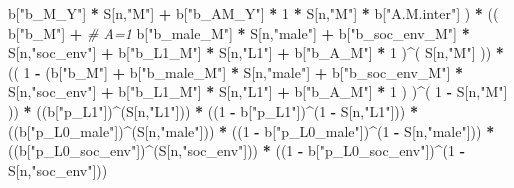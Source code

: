 \documentclass[
]{book}
\newenvironment{Shaded}{\begin{snugshade}}{\end{snugshade}}
\newcommand{\CommentTok}[1]{\textcolor[rgb]{0.56,0.35,0.01}{\textit{#1}}}
\newcommand{\DecValTok}[1]{\textcolor[rgb]{0.00,0.00,0.81}{#1}}
\newcommand{\NormalTok}[1]{#1}
\newcommand{\SpecialCharTok}[1]{\textcolor[rgb]{0.81,0.36,0.00}{\textbf{#1}}}
\newcommand{\StringTok}[1]{\textcolor[rgb]{0.31,0.60,0.02}{#1}}
\begin{document}
\begin{Shaded}
\begin{Highlighting}[]
\NormalTok{                             b[}\StringTok{"b\_M\_Y"}\NormalTok{] }\SpecialCharTok{*}\NormalTok{ S[n,}\StringTok{"M"}\NormalTok{] }\SpecialCharTok{+}
\NormalTok{                             b[}\StringTok{"b\_AM\_Y"}\NormalTok{] }\SpecialCharTok{*} \DecValTok{1} \SpecialCharTok{*}\NormalTok{ S[n,}\StringTok{"M"}\NormalTok{] }\SpecialCharTok{*}\NormalTok{ b[}\StringTok{"A.M.inter"}\NormalTok{] ) }\SpecialCharTok{*}
\NormalTok{      (( b[}\StringTok{"b\_M"}\NormalTok{] }\SpecialCharTok{+}                                                             \CommentTok{\# A\textquotesingle{}=1}
\NormalTok{           b[}\StringTok{"b\_male\_M"}\NormalTok{] }\SpecialCharTok{*}\NormalTok{ S[n,}\StringTok{"male"}\NormalTok{] }\SpecialCharTok{+} 
\NormalTok{           b[}\StringTok{"b\_soc\_env\_M"}\NormalTok{] }\SpecialCharTok{*}\NormalTok{ S[n,}\StringTok{"soc\_env"}\NormalTok{] }\SpecialCharTok{+} 
\NormalTok{           b[}\StringTok{"b\_L1\_M"}\NormalTok{] }\SpecialCharTok{*}\NormalTok{ S[n,}\StringTok{"L1"}\NormalTok{] }\SpecialCharTok{+}
\NormalTok{           b[}\StringTok{"b\_A\_M"}\NormalTok{] }\SpecialCharTok{*} \DecValTok{1}\NormalTok{ )}\SpecialCharTok{\^{}}\NormalTok{( S[n,}\StringTok{"M"}\NormalTok{] )) }\SpecialCharTok{*}
\NormalTok{      (( }\DecValTok{1} \SpecialCharTok{{-}}\NormalTok{ (b[}\StringTok{"b\_M"}\NormalTok{] }\SpecialCharTok{+} 
\NormalTok{                b[}\StringTok{"b\_male\_M"}\NormalTok{] }\SpecialCharTok{*}\NormalTok{ S[n,}\StringTok{"male"}\NormalTok{] }\SpecialCharTok{+} 
\NormalTok{                b[}\StringTok{"b\_soc\_env\_M"}\NormalTok{] }\SpecialCharTok{*}\NormalTok{ S[n,}\StringTok{"soc\_env"}\NormalTok{] }\SpecialCharTok{+} 
\NormalTok{                b[}\StringTok{"b\_L1\_M"}\NormalTok{] }\SpecialCharTok{*}\NormalTok{ S[n,}\StringTok{"L1"}\NormalTok{] }\SpecialCharTok{+}
\NormalTok{                b[}\StringTok{"b\_A\_M"}\NormalTok{] }\SpecialCharTok{*} \DecValTok{1}\NormalTok{ ) )}\SpecialCharTok{\^{}}\NormalTok{( }\DecValTok{1} \SpecialCharTok{{-}}\NormalTok{ S[n,}\StringTok{"M"}\NormalTok{] )) }\SpecialCharTok{*}
\NormalTok{      ((b[}\StringTok{"p\_L1"}\NormalTok{])}\SpecialCharTok{\^{}}\NormalTok{(S[n,}\StringTok{"L1"}\NormalTok{])) }\SpecialCharTok{*}
\NormalTok{      ((}\DecValTok{1} \SpecialCharTok{{-}}\NormalTok{ b[}\StringTok{"p\_L1"}\NormalTok{])}\SpecialCharTok{\^{}}\NormalTok{(}\DecValTok{1} \SpecialCharTok{{-}}\NormalTok{ S[n,}\StringTok{"L1"}\NormalTok{])) }\SpecialCharTok{*}
\NormalTok{      ((b[}\StringTok{"p\_L0\_male"}\NormalTok{])}\SpecialCharTok{\^{}}\NormalTok{(S[n,}\StringTok{"male"}\NormalTok{])) }\SpecialCharTok{*} 
\NormalTok{      ((}\DecValTok{1} \SpecialCharTok{{-}}\NormalTok{ b[}\StringTok{"p\_L0\_male"}\NormalTok{])}\SpecialCharTok{\^{}}\NormalTok{(}\DecValTok{1} \SpecialCharTok{{-}}\NormalTok{ S[n,}\StringTok{"male"}\NormalTok{])) }\SpecialCharTok{*} 
\NormalTok{      ((b[}\StringTok{"p\_L0\_soc\_env"}\NormalTok{])}\SpecialCharTok{\^{}}\NormalTok{(S[n,}\StringTok{"soc\_env"}\NormalTok{])) }\SpecialCharTok{*}
\NormalTok{      ((}\DecValTok{1} \SpecialCharTok{{-}}\NormalTok{ b[}\StringTok{"p\_L0\_soc\_env"}\NormalTok{])}\SpecialCharTok{\^{}}\NormalTok{(}\DecValTok{1} \SpecialCharTok{{-}}\NormalTok{ S[n,}\StringTok{"soc\_env"}\NormalTok{])) }
    

\end{Highlighting}
\end{Shaded}
\end{document}
